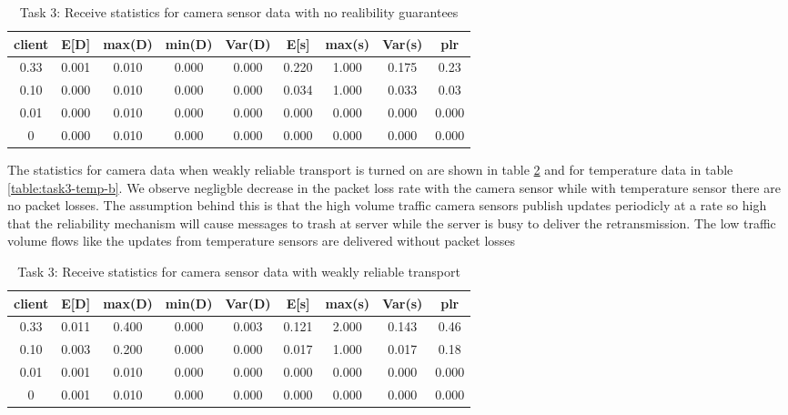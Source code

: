 \begin{table}
\centering
\begin{tabular}{|c|c|c|c|c|c|c|c|c|}
\hline
client & E[D] & max(D) & min(D) & Var(D) & E[s] & max(s) & Var(s) & plr\\
\hline
 0.33 & 0.001 & 0.010 & 0.000 & 0.000 & 0.220 & 1.000 & 0.175 & 0.23\\
\hline
0.10 & 0.000 & 0.010 & 0.000 & 0.000 & 0.034 & 1.000 & 0.033 & 0.03\\
\hline
0.01 & 0.000 & 0.010 & 0.000 & 0.000 & 0.000 & 0.000 & 0.000 & 0.000 \\
\hline
0 & 0.000 & 0.010 & 0.000 & 0.000 & 0.000 & 0.000 & 0.000 & 0.000 \\
\hline
\end{tabular}
\caption{Task 3: Receive statistics for camera sensor data with no realibility guarantees}
\label{table:task3-temp-a}
\end{table}



The statistics for camera data when weakly reliable transport is turned on are shown in table
\ref{table:task3-camera-b} and for temperature data in table
\ref{table:task3-temp-b}. We observe negligble decrease in the packet loss
rate with the camera sensor while with temperature sensor there are no packet
losses. The assumption behind this is that the high volume traffic camera
sensors publish updates periodicly at a rate so high that the reliability
mechanism will cause messages to trash at server while the server is busy to
deliver the retransmission. The low traffic volume flows like the updates from
temperature sensors are delivered without packet losses 

\begin{table}
\centering
\begin{tabular}{|c|c|c|c|c|c|c|c|c|}
\hline
client & E[D] & max(D) & min(D) & Var(D) & E[s] & max(s) & Var(s) & plr\\
\hline
0.33 & 0.011 & 0.400 & 0.000 & 0.003 & 0.121 & 2.000 & 0.143 & 0.46\\
\hline
0.10 &  0.003 & 0.200 & 0.000 & 0.000 & 0.017 & 1.000 & 0.017 & 0.18\\
\hline
0.01 & 0.001 & 0.010 & 0.000 & 0.000 & 0.000 & 0.000 & 0.000 & 0.000 \\
\hline
0 & 0.001 & 0.010 & 0.000 & 0.000 & 0.000 & 0.000 & 0.000 & 0.000 \\
\hline
\end{tabular}
\caption{Task 3: Receive statistics for camera sensor data with weakly reliable transport}
\label{table:task3-camera-b}
\end{table}


